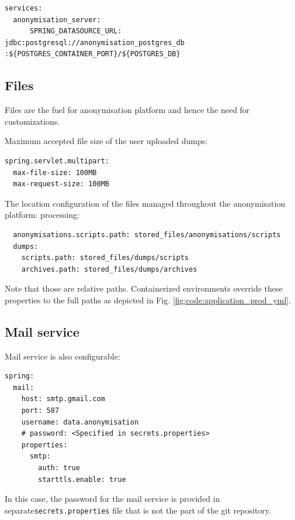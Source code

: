 \documentclass[a4paper,twoside,12pt]{book}
\begin{document}
\begin{verbatim}
services:
  anonymisation_server:
      SPRING_DATASOURCE_URL:  jdbc:postgresql://anonymisation_postgres_db :${POSTGRES_CONTAINER_PORT}/${POSTGRES_DB}
\end{verbatim}

\subsection{Files}

Files are the fuel for anonymisation platform and hence the need for customizations.

Maximum accepted file size of the user uploaded dumps:
\begin{verbatim}
spring.servlet.multipart:
  max-file-size: 100MB
  max-request-size: 100MB
\end{verbatim}

The location configuration of the files managed throughout the anonymisation platform:
processing:
\begin{verbatim}
  anonymisations.scripts.path: stored_files/anonymisations/scripts
  dumps:
    scripts.path: stored_files/dumps/scripts
    archives.path: stored_files/dumps/archives
\end{verbatim}

Note that those are relative paths. Containerized environments override these properties to the full paths as depicted in Fig. \ref{fig:code:application_prod_yml}.



\subsection{Mail service}

Mail service is also configurable:
\begin{verbatim}
spring:
  mail:
    host: smtp.gmail.com
    port: 587
    username: data.anonymisation
    # password: <Specified in secrets.properties>
    properties:
      smtp:
        auth: true
        starttls.enable: true
\end{verbatim}
In this case, the password for the mail service is provided in separate\newline \verb|secrets.properties| file that is not the part of the git repository.
\end{document}
